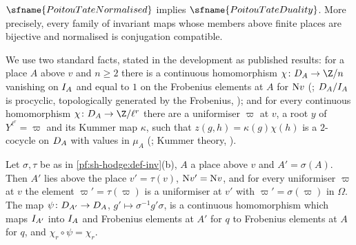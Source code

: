 \begin{theorem}\label{pf:sh-hodge:pt}
$\sfname{PoitouTateNormalised}$ implies $\sfname{PoitouTateDuality}$. More precisely, every family of invariant maps whose members
above finite places are bijective and normalised is conjugation compatible.
\end{theorem}

We use two standard facts, stated in the development as published results: for a place $A$ above $v$ and $n\ge2$ there is a
continuous homomorphism $\chi\colon\shhodgeDec_A\to\Z/n$ vanishing on $I_A$ and equal to $1$ on the Frobenius elements at $A$ for
$\mathrm{N} v$ (; $D_A/I_A$ is procyclic, topologically generated
by the Frobenius, \cite[Ch.~I, \S7]{Serre1979}); and for every continuous homomorphism
$\chi\colon\shhodgeDec_A\to\Z/\ell^r$ there are a uniformiser $\varpi$ at $v$, a root $y$ of $Y^{\ell^r}=\varpi$ and its Kummer map
$\kappa$, such that $z(g,h)=\kappa(g)\chi(h)$ is a $2$-cocycle on $D_A$ with values in $\mu_A$
(; Kummer theory, \cite[Ch.~IV, \S3]{Neukirch1999}).

\begin{lemma}\label{pf:sh-hodge:placemap}
Let $\sigma,\tau$ be as in \cref{pf:sh-hodge:def-inv}(b), $A$ a place above $v$ and $A'=\sigma(A)$. Then $A'$ lies above the place
$v'=\tau(v)$, $\mathrm{N} v'=\mathrm{N} v$, and for every uniformiser $\varpi$ at $v$ the element $\varpi'=\tau(\varpi)$ is a uniformiser at $v'$
with $\varpi'=\sigma(\varpi)$ in $\Omega$. The map $\psi\colon D_{A'}\to D_A$, $g'\mapsto\sigma^{-1}g'\sigma$, is a continuous
homomorphism which maps $I_{A'}$ into $I_A$ and Frobenius elements at $A'$ for $q$ to Frobenius elements at $A$ for
$q$, and $\chi_r\circ\psi=\chi_r$.
\end{lemma}

